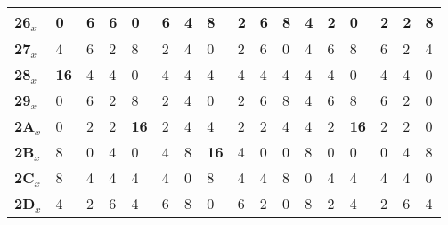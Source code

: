 \begin{longtable}[c]{|l|l|l|l|l|l|l|l|l|l|l|l|l|l|l|l|l|}
\textbf{26$_x$} & 0              & 6              & 6              & 0              & 6              & 4              & 8              & 2              & 6              & 8              & 4              & 2              & 0              & 2              & 2              & 8              \\ \hline
\textbf{27$_x$} & 4              & 6              & 2              & 8              & 2              & 4              & 0              & 2              & 6              & 0              & 4              & 6              & 8              & 6              & 2              & 4              \\ \hline
\textbf{28$_x$} & \textbf{16}             & 4              & 4              & 0              & 4              & 4              & 4              & 4              & 4              & 4              & 4              & 4              & 0              & 4              & 4              & 0              \\ \hline
\textbf{29$_x$} & 0              & 6              & 2              & 8              & 2              & 4              & 0              & 2              & 6              & 8              & 4              & 6              & 8              & 6              & 2              & 0              \\ \hline
\textbf{2A$_x$} & 0              & 2              & 2              & \textbf{16}             & 2              & 4              & 4              & 2              & 2              & 4              & 4              & 2              & \textbf{16}             & 2              & 2              & 0              \\ \hline
\textbf{2B$_x$} & 8              & 0              & 4              & 0              & 4              & 8              & \textbf{16}             & 4              & 0              & 0              & 8              & 0              & 0              & 0              & 4              & 8              \\ \hline
\textbf{2C$_x$} & 8              & 4              & 4              & 4              & 4              & 0              & 8              & 4              & 4              & 8              & 0              & 4              & 4              & 4              & 4              & 0              \\ \hline
\textbf{2D$_x$} & 4              & 2              & 6              & 4              & 6              & 8              & 0              & 6              & 2              & 0              & 8              & 2              & 4              & 2              & 6              & 4              \\ \hline

\end{longtable}
